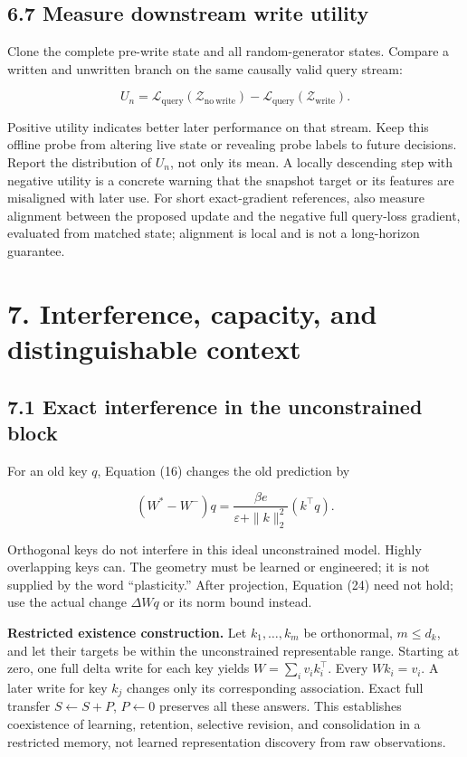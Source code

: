 \documentclass[
  11pt,
  a4paper,
]{article}
\begin{document}
\subsection{6.7 Measure downstream write
utility}\label{measure-downstream-write-utility}

Clone the complete pre-write state and all random-generator states.
Compare a written and unwritten branch on the same causally valid query
stream:

\[
U_n=\mathcal L_{\mathrm{query}}(\mathcal Z_{\mathrm{no\ write}})
-\mathcal L_{\mathrm{query}}(\mathcal Z_{\mathrm{write}}).
\]

Positive utility indicates better later performance on that stream. Keep
this offline probe from altering live state or revealing probe labels to
future decisions. Report the distribution of \(U_n\), not only its mean.
A locally descending step with negative utility is a concrete warning
that the snapshot target or its features are misaligned with later use.
For short exact-gradient references, also measure alignment between the
proposed update and the negative full query-loss gradient, evaluated
from matched state; alignment is local and is not a long-horizon
guarantee.

\section{7. Interference, capacity, and distinguishable
context}\label{interference-capacity-and-distinguishable-context}

\subsection{7.1 Exact interference in the unconstrained
block}\label{exact-interference-in-the-unconstrained-block}

For an old key \(q\), Equation (16) changes the old prediction by

\[
(W^*-W^-)q
=\frac{\beta e}{\varepsilon+\|k\|_2^2}(k^\top q).
\tag{24}
\]

Orthogonal keys do not interfere in this ideal unconstrained model.
Highly overlapping keys can. The geometry must be learned or engineered;
it is not supplied by the word ``plasticity.'' After projection,
Equation (24) need not hold; use the actual change \(\Delta Wq\) or its
norm bound instead.

\textbf{Restricted existence construction.} Let \(k_1,\ldots,k_m\) be
orthonormal, \(m\le d_k\), and let their targets be within the
unconstrained representable range. Starting at zero, one full delta
write for each key yields \(W=\sum_i v_i k_i^\top\). Every \(Wk_i=v_i\).
A later write for key \(k_j\) changes only its corresponding
association. Exact full transfer \(S\leftarrow S+P\), \(P\leftarrow0\)
preserves all these answers. This establishes coexistence of learning,
retention, selective revision, and consolidation in a restricted memory,
not learned representation discovery from raw observations.
\end{document}
